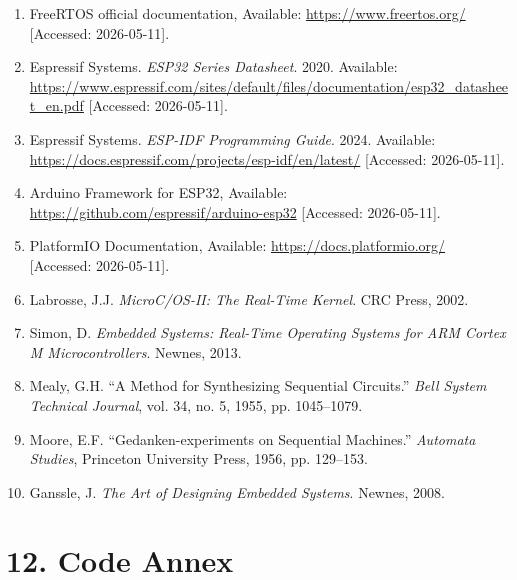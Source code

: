 \documentclass[12pt]{article}
\begin{document}
\begin{enumerate}
    \item FreeRTOS official documentation, Available: \url{https://www.freertos.org/} [Accessed: 2026-05-11].

    \item Espressif Systems. \textit{ESP32 Series Datasheet}. 2020. Available: \url{https://www.espressif.com/sites/default/files/documentation/esp32_datasheet_en.pdf} [Accessed: 2026-05-11].

    \item Espressif Systems. \textit{ESP-IDF Programming Guide}. 2024. Available: \url{https://docs.espressif.com/projects/esp-idf/en/latest/} [Accessed: 2026-05-11].

    \item Arduino Framework for ESP32, Available: \url{https://github.com/espressif/arduino-esp32} [Accessed: 2026-05-11].

    \item PlatformIO Documentation, Available: \url{https://docs.platformio.org/} [Accessed: 2026-05-11].

    \item Labrosse, J.J. \textit{MicroC/OS-II: The Real-Time Kernel}. CRC Press, 2002.

    \item Simon, D. \textit{Embedded Systems: Real-Time Operating Systems for ARM Cortex M Microcontrollers}. Newnes, 2013.

    \item Mealy, G.H. ``A Method for Synthesizing Sequential Circuits.'' \textit{Bell System Technical Journal}, vol. 34, no. 5, 1955, pp. 1045--1079.

    \item Moore, E.F. ``Gedanken-experiments on Sequential Machines.'' \textit{Automata Studies}, Princeton University Press, 1956, pp. 129--153.

    \item Ganssle, J. \textit{The Art of Designing Embedded Systems}. Newnes, 2008.
\end{enumerate}

\section*{12. Code Annex}
\end{document}
